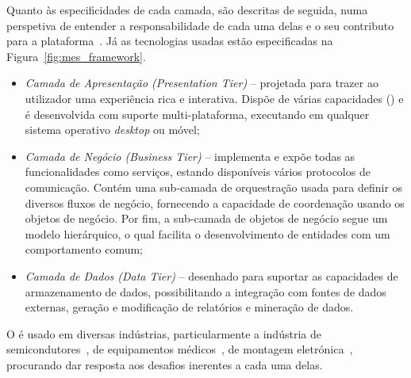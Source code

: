 Quanto às especificidades de cada camada, são descritas de seguida, numa perspetiva de entender a responsabilidade de cada uma delas e o seu contributo para a plataforma~\parencite{cmf_mes_framework}. Já as tecnologias usadas estão especificadas na Figura~\ref{fig:mes_framework}.

\begin{itemize}
    \item 
    {
        \textit{Camada de Apresentação (Presentation Tier)} -- projetada para trazer ao utilizador uma experiência rica e interativa. Dispõe de várias capacidades () e é desenvolvida com suporte multi-plataforma, executando em qualquer sistema operativo \textit{desktop} ou móvel;
    }
    \item
    {
        \textit{Camada de Negócio (Business Tier)} -- implementa e expõe todas as funcionalidades como serviços, estando disponíveis vários protocolos de comunicação. Contém uma sub-camada de orquestração usada para definir os diversos fluxos de negócio, fornecendo a capacidade de coordenação usando os objetos de negócio. Por fim, a sub-camada de objetos de negócio segue um modelo hierárquico, o qual facilita o desenvolvimento de entidades com um comportamento comum;
    }
    \item
    {
        \textit{Camada de Dados (Data Tier)} -- desenhado para suportar as capacidades de armazenamento de dados, possibilitando a integração com fontes de dados externas, geração e modificação de relatórios e mineração de dados.
    }
\end{itemize}

O {\productname} é usado em diversas indústrias, particularmente a indústria de semicondutores~\parencite{cmf_industries_semiconductor}, de equipamentos médicos~\parencite{cmf_industries_medical_devices}, de montagem eletrónica~\parencite{cmf_industries_electronics}, procurando dar resposta aos desafios inerentes a cada uma delas.
